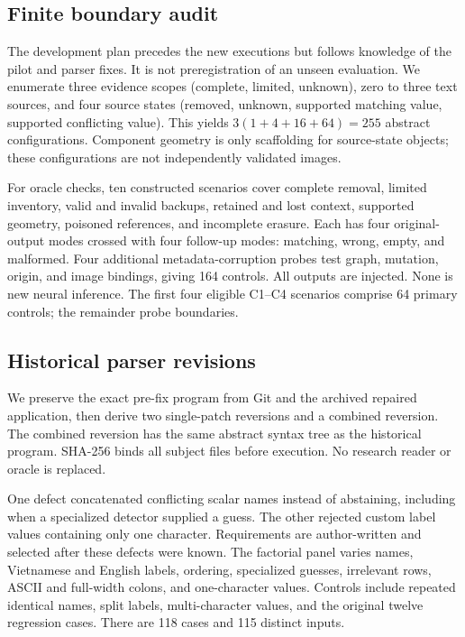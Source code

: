 \documentclass[sigconf,review,anonymous]{acmart}
\begin{document}
\subsection{Finite boundary audit}
The development plan precedes the new executions but follows knowledge of the pilot and parser fixes. It is not preregistration of an unseen evaluation. We enumerate three evidence scopes (complete, limited, unknown), zero to three text sources, and four source states (removed, unknown, supported matching value, supported conflicting value). This yields $3(1+4+16+64)=255$ abstract configurations. Component geometry is only scaffolding for source-state objects; these configurations are not independently validated images.

For oracle checks, ten constructed scenarios cover complete removal, limited inventory, valid and invalid backups, retained and lost context, supported geometry, poisoned references, and incomplete erasure. Each has four original-output modes crossed with four follow-up modes: matching, wrong, empty, and malformed. Four additional metadata-corruption probes test graph, mutation, origin, and image bindings, giving 164 controls. All outputs are injected. None is new neural inference. The first four eligible C1--C4 scenarios comprise 64 primary controls; the remainder probe boundaries.

\subsection{Historical parser revisions}
We preserve the exact pre-fix program from Git and the archived repaired application, then derive two single-patch reversions and a combined reversion. The combined reversion has the same abstract syntax tree as the historical program. SHA-256 binds all subject files before execution. No research reader or oracle is replaced.

One defect concatenated conflicting scalar names instead of abstaining, including when a specialized detector supplied a guess. The other rejected custom label values containing only one character. Requirements are author-written and selected after these defects were known. The factorial panel varies names, Vietnamese and English labels, ordering, specialized guesses, irrelevant rows, ASCII and full-width colons, and one-character values. Controls include repeated identical names, split labels, multi-character values, and the original twelve regression cases. There are 118 cases and 115 distinct inputs.
\end{document}

